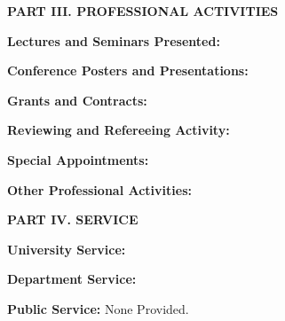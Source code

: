 \documentclass[10pt]{article}
\begin{document}
\vspace{0.5cm}
\textbf{PART III.  PROFESSIONAL ACTIVITIES}

\vspace{0.5cm}
\textbf{Lectures and Seminars Presented:}
\vspace{0.25cm}
{\setlength{\extrarowheight}{3.5pt}

}


\vspace{0.5cm}
\textbf{Conference Posters and Presentations:}
\vspace{0.25cm}
{\setlength{\extrarowheight}{3.5pt}

}

\vspace{0.5cm}
\textbf{Grants and Contracts:}
\vspace{0.25cm}
{\setlength{\extrarowheight}{3.5pt}

}

\vspace{0.5cm}
\textbf{Reviewing and Refereeing Activity:}
\vspace{0.2cm}


\vspace{0.25cm}
\textbf{Special Appointments:}
\vspace{0.15cm}


\newpage

\vspace{0.2cm}
\textbf{Other Professional Activities:}
\vspace{0.15cm}




\vspace{0.25cm}
\textbf{PART IV.  SERVICE}

\vspace{0.5cm}
\textbf{University Service:}
\vspace{0.2cm}


\vspace{0.25cm}
\textbf{Department Service:}
\vspace{0.2cm}


\vspace{1.25cm}
\textbf{Public Service:}
\vspace{0.2cm}
None Provided.
\end{document}
